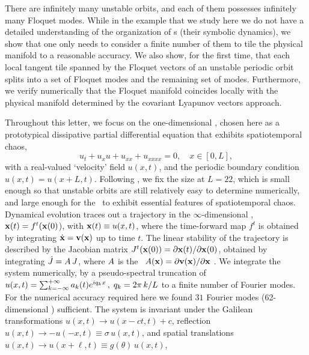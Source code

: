 \documentclass[prl,aps,preprint,showpacs,superscriptaddress]{revtex4-1} %
\begin{document}
There are infinitely many unstable orbits, and each of them
{possesses} infinitely many Floquet modes. While in the example that we
study here we do not have a detailed understanding of the organization of
\po s (their symbolic dynamics), we
show that one only needs to consider a finite number of
them to tile the physical manifold to a reasonable accuracy.
We also show, for the first time, that each local tangent tile spanned by
the Floquet vectors of an unstable periodic orbit splits into a set of
{\entangled} Floquet modes  and the remaining set of {\transient} modes.
Furthermore, we verify numerically that the {\entangled} Floquet manifold
coincides locally with the physical manifold determined by the covariant
Lyapunov vectors approach.


Throughout this letter, we focus on the one-dimensional
\KSe{}, chosen here as a prototypical dissipative
partial differential equation that
exhibits spatiotemporal chaos,
\begin{equation}
  u_t+u_x u+u_{xx}+u_{xxxx}=0, \quad x\in [0,L],
  \label{eq:ks}
\end{equation}
with a real-valued `velocity' field $u(x,t)$, and the periodic boundary
condition $u(x,t)=u(x+L,t)$. Following , we fix the size at
$L=22$, which is small enough so that unstable orbits are still
relatively easy to determine numerically, and large enough for the \KSe\
to exhibit essential features of spatiotemporal chaos.
Dynamical evolution traces out a trajectory in the $\infty$-dimensional
\statesp, $\mathrm{\mathbf{x}}(t)=f^t(\mathrm{\mathbf{x}}(0)$), with $\mathrm{\mathbf{x}}(t)\equiv{}u(x,t)$, where the
time-forward map $f^t$ is obtained by integrating
\(\dot{\mathrm{\mathbf{x}}} = \mathrm{\mathbf{v}}(\mathrm{\mathbf{x}})\) up to
time $t$. The linear stability of the trajectory is described by the
Jacobian matrix $J^{t}(\mathrm{\mathbf{x}}(0))=\partial\mathrm{\mathbf{x}}(t)/\partial\mathrm{\mathbf{x}}(0)$,
obtained by integrating
\(\dot{J} = A\,J\),
where $A$ is the \stabmat\
\(A(\mathrm{\mathbf{x}}) = \partial \mathrm{\mathbf{v}}(\mathrm{\mathbf{x}})/\partial \mathrm{\mathbf{x}}\) .
We integrate the system  numerically, by a pseudo-spectral
truncation\rf{cox02jcomp,ks05com}  of
\(
 u(x,t)=\sum_{k=-\infty}^{+\infty} a_k(t) e^{ i q_k x}
\,,\;   q_k = 2\pi\,k/L
\)
to a finite number of Fourier modes. For the numerical accuracy required
here we found $31$ Fourier modes (62-dimensional \statesp) sufficient.
The system is invariant under the Galilean transformations
$u(x,t)\to{}u(x-ct,t)+c$,
reflection $u(x,t)\to-u(-x,t)\equiv\sigma\,u(x,t)$,
and spatial translations
$u(x,t)\to{}u(x+\ell,t)\equiv{}g(\theta)\,u(x,t)$,
\end{document}

